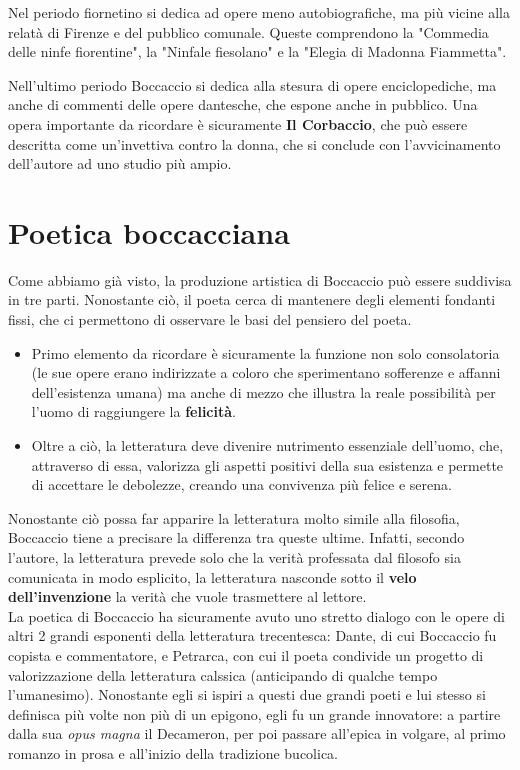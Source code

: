 \documentclass[10pt,a4paper]{article}
\begin{document}
	 Nel periodo fiornetino si dedica ad opere meno autobiografiche, ma più vicine alla relatà di Firenze e del pubblico comunale. Queste comprendono la "Commedia delle ninfe fiorentine", la "Ninfale fiesolano" e la "Elegia di Madonna Fiammetta".

	 Nell'ultimo periodo Boccaccio si dedica alla stesura di opere enciclopediche, ma anche di commenti delle opere dantesche, che espone anche in pubblico. Una opera importante da ricordare è sicuramente \textbf{Il Corbaccio}, che può essere descritta come un'invettiva contro la donna, che si conclude con l'avvicinamento dell'autore ad uno studio più ampio.

	 \section{Poetica boccacciana}

	 Come abbiamo già visto, la produzione artistica di Boccaccio può essere suddivisa in tre parti. Nonostante ciò, il poeta cerca di mantenere degli elementi fondanti fissi, che ci permettono di osservare le basi del pensiero del poeta.
	 \begin{itemize}
	 	\item Primo elemento da ricordare è sicuramente la funzione non solo consolatoria (le sue opere erano indirizzate a coloro che sperimentano sofferenze e affanni dell'esistenza umana) ma anche di mezzo che illustra la reale possibilità per l'uomo di raggiungere la \textbf{felicità}.
		\item Oltre a ciò, la letteratura deve divenire nutrimento essenziale dell'uomo, che, attraverso di essa, valorizza gli aspetti positivi della sua esistenza e permette di accettare le debolezze, creando una convivenza più felice e serena.
	 \end{itemize}
	 Nonostante ciò possa far apparire la letteratura molto simile alla filosofia, Boccaccio tiene a precisare la differenza tra queste ultime. Infatti, secondo l'autore, la letteratura prevede solo che la verità professata dal filosofo sia comunicata in modo esplicito, la letteratura nasconde sotto il \textbf{velo dell'invenzione} la verità che vuole trasmettere al lettore. \\

	  La poetica di Boccaccio ha sicuramente avuto uno stretto dialogo con le opere di altri 2 grandi esponenti della letteratura trecentesca: Dante, di cui Boccaccio fu copista e commentatore, e Petrarca, con cui il poeta condivide un progetto di valorizzazione della letteratura calssica (anticipando di qualche tempo l'umanesimo). Nonostante egli si ispiri a questi due grandi poeti e lui stesso si definisca più volte non più di un epigono, egli fu un grande innovatore: a partire dalla sua \textit{opus magna} il Decameron, per poi passare all'epica in volgare, al primo romanzo in prosa e all'inizio della tradizione bucolica.
\end{document}
